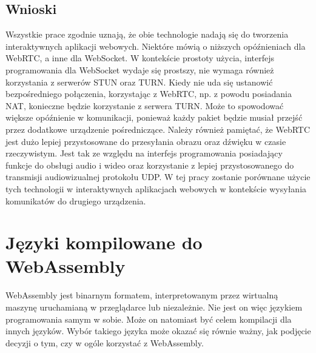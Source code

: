 \documentclass[language=polish,type=master]{aghmodern}
\begin{document}
\section{Wnioski}
Wszystkie prace zgodnie uznają, że obie technologie nadają się do tworzenia interaktywnych aplikacji webowych.
Niektóre mówią o niższych opóźnieniach dla WebRTC, a inne dla WebSocket.
W kontekście prostoty użycia, interfejs programowania dla WebSocket wydaje się prostszy, nie wymaga również korzystania z serwerów STUN oraz TURN.
Kiedy nie uda się ustanowić bezpośredniego połączenia, korzystając z WebRTC, np. z powodu posiadania NAT, konieczne będzie korzystanie z serwera TURN.
Może to spowodować większe opóźnienie w komunikacji, ponieważ każdy pakiet będzie musiał przejść przez dodatkowe urządzenie pośredniczące.
Należy również pamiętać, że WebRTC jest dużo lepiej przystosowane do przesyłania obrazu oraz dźwięku w czasie rzeczywistym.
Jest tak ze względu na interfejs programowania posiadający funkcje do obsługi audio i wideo oraz korzystanie z lepiej przystosowanego do transmisji audiowizualnej protokołu UDP.
W tej pracy zostanie porównane użycie tych technologii w interaktywnych aplikacjach webowych w kontekście wysyłania komunikatów do drugiego urządzenia.

\chapter{Języki kompilowane do WebAssembly}
WebAssembly jest binarnym formatem, interpretowanym przez wirtualną maszynę uruchamianą w przeglądarce lub niezależnie.
Nie jest on więc językiem programowania samym w sobie.
Może on natomiast być celem kompilacji dla innych języków.
Wybór takiego języka może okazać się równie ważny, jak podjęcie decyzji o tym, czy w ogóle korzystać z WebAssembly.
\end{document}
